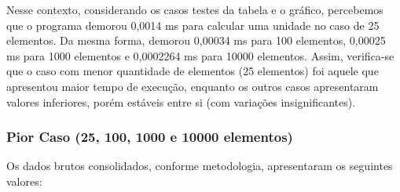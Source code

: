 \documentclass[a4paper, 12pt]{article}
\begin{document}
\vspace{0.8cm}
Nesse contexto, considerando os casos testes da tabela e o gráfico, percebemos que o programa demorou 0,0014 ms para calcular uma unidade no caso de 25 elementos. Da mesma forma, demorou 0,00034 ms para 100 elementos, 0,00025 ms para 1000 elementos e 0,0002264 ms para 10000 elementos. Assim, verifica-se que o caso com menor quantidade de elementos (25 elementos) foi aquele que apresentou maior tempo de execução, enquanto os outros casos apresentaram valores inferiores, porém estáveis entre si (com variações insignificantes).


\subsubsection{Pior Caso (25, 100, 1000 e 10000 elementos)}

\tab{ }Os dados brutos consolidados, conforme metodologia, apresentaram os seguintes valores:
\vspace{0.2cm}
\end{document}
